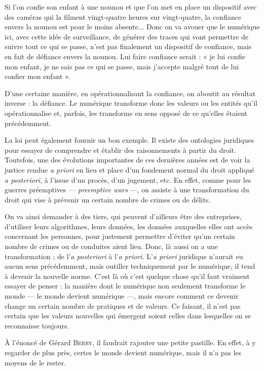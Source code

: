 Si l'on confie son enfant à une nounou et que l'on met en place un dispositif avec des caméras qui la filment vingt-quatre heures sur vingt-quatre, la confiance envers la nounou est pour le moins absente... Donc on va avouer que le numérique ici, avec cette idée de surveillance, de générer des traces qui vont permettre de suivre tout ce qui se passe, n'est pas finalement un dispositif de confiance, mais en fait de défiance envers la nounou. Lui faire confiance serait : « je lui confie mon enfant, je ne sais pas ce qui se passe, mais j'accepte malgré tout de lui confier mon enfant ». 

D'une certaine manière, en opérationnalisant la confiance, on aboutit au résultat inverse : la défiance. Le numérique transforme donc les valeurs ou les entités qu'il opérationnalise et, parfois, les transforme en sens opposé de ce qu'elles étaient précédemment.

La loi peut également fournir un bon exemple. Il existe des ontologies juridiques pour essayer de comprendre et établir des raisonnements à partir du droit. Toutefois, une des évolutions importantes de ces dernières années est de voir la justice rendue \textit{a priori} en lieu et place d'un fondement normal du droit appliqué \textit{a posteriori}, à l'issue d'un procès, d'un jugement, etc. En effet, comme pour les guerres préemptives --- \textit{preemptive wars} ---, on assiste à une transformation du droit qui vise à prévenir un certain nombre de crimes ou de délits.

On va ainsi demander à des tiers, qui peuvent d'ailleurs être des entreprises, d'utiliser leurs algorithmes, leurs données, les données auxquelles elles ont accès concernant les personnes, pour justement permettre d'éviter qu'un certain nombre de crimes ou de conduites aient lieu. Donc, là aussi on a une transformation ; de l'\textit{a posteriori} à l'\textit{a priori}. L'\textit{a priori} juridique n'aurait eu aucun sens précédemment, mais outiller techniquement par le numérique, il tend à devenir la nouvelle norme. C'est là où c'est quelque chose qu'il faut vraiment essayer de penser : la manière dont le numérique non seulement transforme le monde --- le monde devient numérique ---, mais encore comment ce devenir change un certain nombre de pratiques et de valeurs. Ce faisant, il n'est pas certain que les valeurs nouvelles qui émergent soient celles dans lesquelles on se reconnaisse toujours. 


À l'énoncé de Gérard \textsc{Berry}, il faudrait rajouter une petite pastille. En effet, à y regarder de plus près, certes le monde devient numérique, mais il n'a pas les moyens de le rester.

